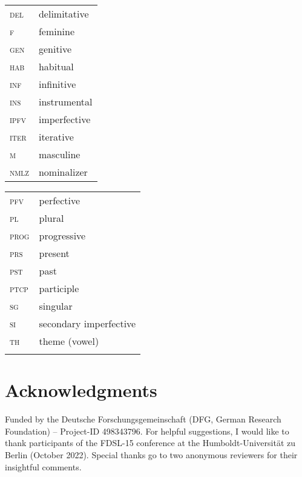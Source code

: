 \documentclass[output=paper,colorlinks,citecolor=brown]{langscibook}
\begin{document}
\begin{tabularx}{.5\textwidth}{@{}lQ}
\textsc{del}&delimitative\\
\textsc{f}&feminine\\
\textsc{gen}&genitive\\
\textsc{hab}&habitual\\
\textsc{inf}&infinitive\\
\textsc{ins}&instrumental\\
\textsc{ipfv}&imperfective\\
\textsc{iter}&iterative\\
\textsc{m}&masculine\\
\textsc{nmlz}&nominalizer\\
\end{tabularx}%
\begin{tabularx}{.5\textwidth}{lQ@{}}
\textsc{pfv}&perfective\\
\textsc{pl}&plural\\
\textsc{prog}&progressive\\
\textsc{prs}&present\\
\textsc{pst}&past\\
\textsc{ptcp}&participle\\
\textsc{sg}&singular\\
\textsc{si}&secondary imperfective\\
\textsc{th}&theme (vowel)\\
\\
\end{tabularx}

\section*{Acknowledgments}
Funded by the Deutsche Forschungsgemeinschaft (DFG, German Research Foundation) -- Project-ID 498343796. For helpful suggestions, I would like to thank participants of the FDSL-15 conference at the Humboldt-Universität zu Berlin (October 2022). Special thanks go to two anonymous reviewers for their insightful comments.

\printbibliography[heading=subbibliography,notkeyword=this]
\end{document}

